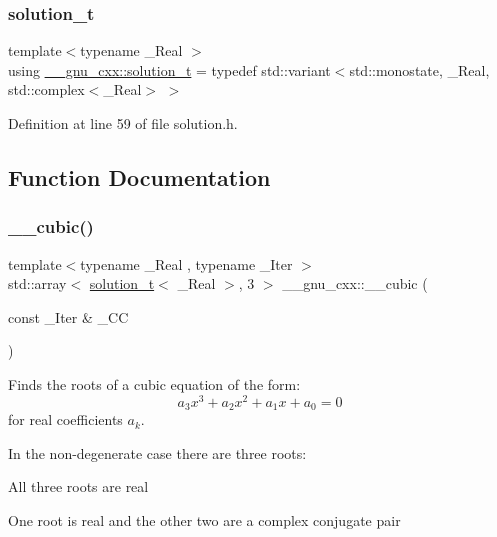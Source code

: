 \subsubsection{\texorpdfstring{solution\+\_\+t}{solution\_t}}
{\footnotesize\ttfamily template$<$typename \+\_\+\+Real $>$ \\
using \hyperlink{namespace____gnu__cxx_ae20ea642de50eb361074c62676b0159c}{\+\_\+\+\_\+gnu\+\_\+cxx\+::solution\+\_\+t} = typedef std\+::variant$<$std\+::monostate, \+\_\+\+Real, std\+::complex$<$\+\_\+\+Real$>$ $>$}



Definition at line 59 of file solution.\+h.



\subsection{Function Documentation}
\mbox{\label{namespace____gnu__cxx_a422f638b186be2071012321de5f9bb48}} 
\subsubsection{\texorpdfstring{\+\_\+\+\_\+cubic()}{\_\_cubic()}\hspace{0.1cm}{\footnotesize\ttfamily [1/2]}}
{\footnotesize\ttfamily template$<$typename \+\_\+\+Real , typename \+\_\+\+Iter $>$ \\
std\+::array$<$ \hyperlink{namespace____gnu__cxx_ae20ea642de50eb361074c62676b0159c}{solution\+\_\+t}$<$ \+\_\+\+Real $>$, 3 $>$ \+\_\+\+\_\+gnu\+\_\+cxx\+::\+\_\+\+\_\+cubic (\begin{DoxyParamCaption}\item[{const \+\_\+\+Iter \&}]{\+\_\+\+CC }\end{DoxyParamCaption})}



Finds the roots of a cubic equation of the form\+: \[ a_3 x^3 + a_2 x^2 + a_1 x + a_0 = 0 \] for real coefficients $ a_k $. 

In the non-\/degenerate case there are three roots\+:
\begin{DoxyItemize}
\item All three roots are real
\item One root is real and the other two are a complex conjugate pair
\end{DoxyItemize}

